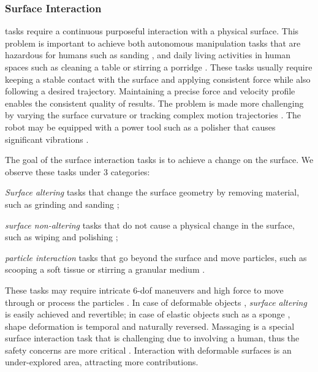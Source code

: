 \documentclass[Afour,sageh,times]{template/sagej}
\newcommand{\suggest}[1]{{\color{olive} (#1)}}
\begin{document}


\subsubsection{Surface Interaction} \label{sec:task-surface} tasks require a continuous purposeful interaction with a physical surface.
This problem is important to achieve both autonomous manipulation tasks that are hazardous for humans such as sanding \citep{89}, and daily living activities in human spaces such as cleaning a table \citep{35} or stirring a porridge \citep{191}. 
These tasks usually require keeping a stable contact with the surface and applying consistent force while also following a desired trajectory. Maintaining a precise force and velocity profile enables the consistent quality of results. The problem is made more challenging by varying the surface curvature \citep{2, 142} or tracking complex motion trajectories \citep{107}. The robot may be equipped with a power tool such as a polisher that causes significant vibrations \citep{425online}.

The goal of the surface interaction tasks is to achieve a change on the surface. We observe these tasks under 3 categories: \begin{enumerate*}
    \item \textit{Surface altering} tasks that change the surface geometry by removing material, such as grinding and sanding \citep{89, 142};
    \item \textit{surface non-altering} tasks that do not cause a physical change in the surface, such as wiping and polishing \citep{66, 56};
    \item \textit{particle interaction} tasks that go beyond the surface and move particles, such as scooping a soft tissue \citep{188} or stirring a granular medium  \citep{92, 191}. 
\end{enumerate*}
These tasks may require intricate 6-dof maneuvers and high force to move through or process the particles \citep{12}.
In case of deformable objects \citep{zhu2022challenges}, \textit{surface altering} is easily achieved and revertible; in case of elastic objects such as a sponge \citep{44}, shape deformation is temporal and naturally reversed. Massaging is a special surface interaction task that is challenging due to involving a human, thus the safety concerns are more critical \citep{46}.
Interaction with deformable surfaces is an under-explored area, attracting more contributions.
\end{document}
